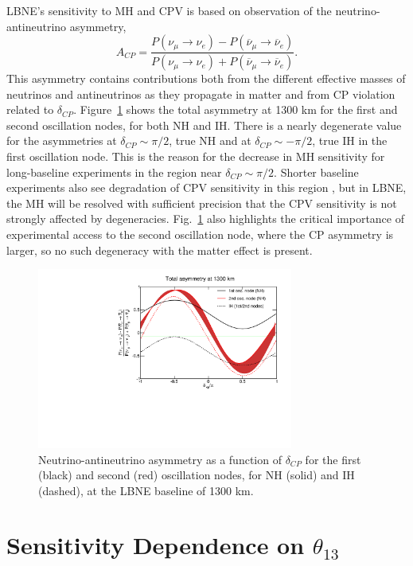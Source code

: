 \documentclass[letterpaper,11pt]{article}
\newcommand{\thetaonethree}{\mbox{$\theta_{13}$}}
\begin{document}
LBNE's sensitivity to MH and CPV is based on observation of the neutrino-antineutrino 
asymmetry,
\begin{equation}
A_{CP} = \frac{P(\nu_\mu \rightarrow \nu_e) -
  P(\overline{\nu}_\mu \rightarrow \overline{\nu}_e)}{P(\nu_\mu \rightarrow
  \nu_e) + P(\overline{\nu}_\mu \rightarrow \overline{\nu}_e)}.
\end{equation}
This asymmetry contains contributions both from 
the different effective masses of neutrinos and antineutrinos as they propagate 
in matter and from CP violation related to $\delta_{CP}$.
Figure~\ref{fig:cpasymm} shows the total asymmetry at 1300 km for the first
and second oscillation nodes, for both NH and IH.
There is a nearly degenerate value for the asymmetries at $\delta_{CP}\sim\pi/2$, 
true NH and at $\delta_{CP}\sim-\pi/2$, true IH in the first oscillation node. This
is the reason for the decrease in MH sensitivity for long-baseline experiments in
the region near $\delta_{CP}\sim\pi/2$. Shorter baseline experiments also see
degradation of CPV sensitivity in this region \cite{NOVA/T2K}, but in LBNE, the MH
will be resolved with sufficient precision that the CPV sensitivity is not strongly
affected by degeneracies. Fig.~\ref{fig:cpasymm} also highlights the critical importance
of experimental access to the second oscillation node, where the CP asymmetry is larger,
so no such degeneracy with the matter effect is present. 
%
\begin{figure}[!htb]
  \centering
  \includegraphics[width=0.75\textwidth]{figs/asym_vs_dcp_1300km.pdf}
  \caption{Neutrino-antineutrino asymmetry as a function of $\delta_{CP}$ for
  the first (black) and second (red) oscillation nodes, for NH (solid) and IH (dashed),
  at the LBNE baseline of 1300 km.} 
  \label{fig:cpasymm}
\end{figure}

\section{Sensitivity Dependence on $\thetaonethree$}
\label{sect:t13}
\end{document}
